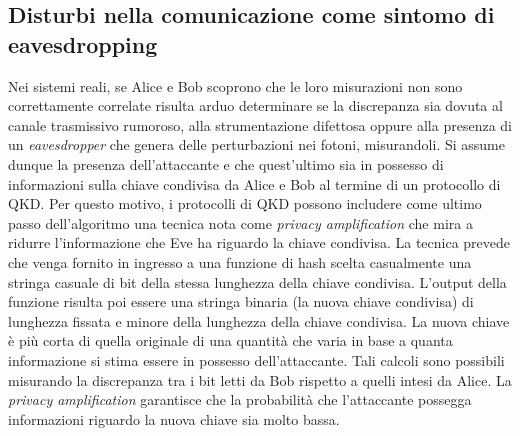 \subsection{Disturbi nella comunicazione come sintomo di eavesdropping}
Nei sistemi reali, se Alice e Bob scoprono che le loro misurazioni non sono correttamente correlate risulta arduo determinare se la discrepanza sia dovuta al canale trasmissivo rumoroso, alla strumentazione difettosa oppure alla presenza di un \textit{eavesdropper} che genera delle perturbazioni nei fotoni, misurandoli. Si assume dunque la presenza dell'attaccante e che quest'ultimo sia in possesso di informazioni sulla chiave condivisa da Alice e Bob al termine di un protocollo di QKD. Per questo motivo, i protocolli di QKD possono includere come ultimo passo dell'algoritmo una tecnica nota come \textit{privacy amplification} \cite{security_individual_realistic_qkd} che mira a ridurre l'informazione che Eve ha riguardo la chiave condivisa.  La tecnica prevede che venga fornito in ingresso a una funzione di hash scelta casualmente una stringa casuale di bit della stessa lunghezza della chiave condivisa. L'output della funzione risulta poi essere una stringa binaria (la nuova chiave condivisa) di lunghezza fissata e minore della lunghezza della chiave condivisa. La nuova chiave è più corta di quella originale di una quantità che varia in base a quanta informazione si stima essere in possesso dell'attaccante. Tali calcoli sono possibili misurando la discrepanza tra i bit letti da Bob rispetto a quelli intesi da Alice. La \textit{privacy amplification} garantisce che la probabilità che l'attaccante possegga informazioni riguardo la nuova chiave sia molto bassa.